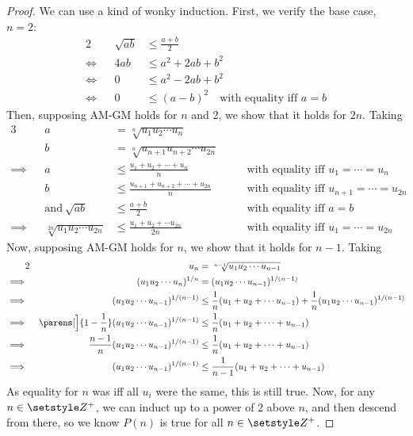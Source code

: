 \begin{proof}
 We can use a kind of wonky induction. First, we verify the base
 case, \(n = 2\):
 \begin{alignat*}2
  &&\sqrt{ab} &\le \frac{a + b}2 \\
  \iff{}&& 4ab &\le a^2 + 2ab + b^2 \\
  \iff{}&& 0 &\le a^2 - 2ab + b^2 \\
  \iff{}&& 0 &\le (a - b)^2\quad \text{with equality iff \(a = b\)}
 \end{alignat*}
 Then, supposing AM-GM holds for \(n\) and 2, we show that it holds for
 \(2n\). Taking
 \begin{alignat*}3
  &&a &= \sqrt[n]{u_1 u_2 \dotsm u_n} \\
  &&b &= \sqrt[n]{u_{n+1} u_{n+2} \dotsm u_{2n}} \\
  \implies{}&& a &\le \frac{u_1 + u_2 + \dotsb + u_n}n
          &&\quad \text{with equality iff \(u_1 = \dotsb = u_n\)}\\
  &&b &\le \frac{u_{n + 1} + u_{n + 2} + \dotsb + u_{2n}}n
          &&\quad \text{with equality iff \(u_{n+1} = \dotsb = u_{2n}\)}\\
  &&\text{and}\ \sqrt{ab} &\le \frac{a + b}2
      &&\quad \text{with equality iff \(a = b\)}\\
  \implies{}&& \sqrt[2n]{u_1 u_2 \dotsm u_{2n}} &\le
          \frac{u_1 + u_2 + \dotsb u_{2n}}{2n}
          &&\quad \text{with equality iff \(u_1 = \dotsb = u_{2n}\)}
 \end{alignat*}
 Now, supposing AM-GM holds for \(n\), we show that it holds for \(n - 1\).
 Taking
 \begin{alignat*}2
  &&u_n &= \sqrt[n - 1]{u_1 u_2 \dotsm u_{n - 1}} \\
  \implies{}&& (u_1 u_2 \dotsm u_n)^{1 / n}
          &= (u_1 u_2 \dotsm u_{n - 1})^{1 / (n - 1)} \\
  \implies{}&& (u_1 u_2 \dotsm u_{n - 1})^{1 / (n - 1)} &\le
          \frac 1n (u_1 + u_2 + \dotsb u_{n - 1}) +
          \frac 1n (u_1 u_2 \dotsm u_{n - 1})^{1 / (n - 1)} \\
  \implies{}&& \parens[\Big]{1 - \frac 1n}
      (u_1 u_2 \dotsm u_{n - 1})^{1 / (n - 1)} &\le
      \frac 1n (u_1 + u_2 + \dotsb + u_{n - 1}) \\
  \implies{}&& \frac {n - 1}n
          (u_1 u_2 \dotsb u_{n - 1})^{1 / (n - 1)} &\le
          \frac 1n (u_1 + u_2 + \dotsb + u_{n - 1}) \\
  \implies{}&& (u_1 u_2 \dotsm u_{n - 1})^{1 / (n - 1)} &\le
          \frac 1{n - 1} (u_1 + u_2 + \dotsb + u_{n - 1})
 \end{alignat*}
 As equality for \(n\) was iff all \(u_i\) were the same, this is still true.
 Now, for any \(n \in \Integers^+\), we can induct up to a power of 2 above
 \(n\), and then descend from there, so we know \(P(n)\) is true for all
 \(n \in \Integers^+\).
\end{proof}

